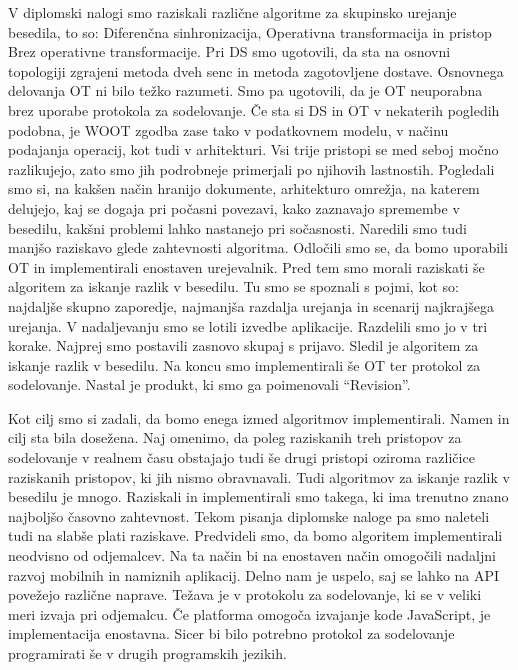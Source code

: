 \documentclass[a4paper, 12pt, twoside]{book}
\begin{document}
V diplomski nalogi smo raziskali različne algoritme za skupinsko urejanje besedila, to so: Diferenčna sinhronizacija, Operativna transformacija in pristop Brez operativne transformacije. Pri DS smo ugotovili, da sta na osnovni topologiji zgrajeni metoda dveh senc in metoda zagotovljene dostave. Osnovnega delovanja OT ni bilo težko razumeti. Smo pa ugotovili, da je OT neuporabna brez uporabe protokola za sodelovanje. Če sta si DS in OT v nekaterih pogledih podobna, je WOOT zgodba zase tako v podatkovnem modelu, v načinu podajanja operacij, kot tudi v arhitekturi. Vsi trije pristopi se med seboj močno razlikujejo, zato smo jih podrobneje primerjali po njihovih lastnostih. Pogledali smo si, na kakšen način hranijo dokumente, arhitekturo omrežja, na katerem delujejo, kaj se dogaja pri počasni povezavi, kako zaznavajo spremembe v besedilu, kakšni problemi lahko nastanejo pri sočasnosti. Naredili smo tudi manjšo raziskavo glede zahtevnosti algoritma. Odločili smo se, da bomo uporabili OT in implementirali enostaven urejevalnik. Pred tem smo morali raziskati še algoritem za iskanje razlik v besedilu. Tu smo se spoznali s pojmi, kot so: najdaljše skupno zaporedje, najmanjša razdalja urejanja in scenarij najkrajšega urejanja. V nadaljevanju smo se lotili izvedbe aplikacije. Razdelili smo jo v tri korake. Najprej smo postavili zasnovo skupaj s prijavo. Sledil je algoritem za iskanje razlik v besedilu. Na koncu smo implementirali še OT ter protokol za sodelovanje. Nastal je produkt, ki smo ga poimenovali “Revision”.

Kot cilj smo si zadali, da bomo enega izmed algoritmov implementirali. Namen in cilj sta bila dosežena. Naj omenimo, da poleg raziskanih treh pristopov za sodelovanje v realnem času obstajajo tudi še drugi pristopi oziroma različice raziskanih pristopov, ki jih nismo obravnavali. Tudi algoritmov za iskanje razlik v besedilu je mnogo. Raziskali in implementirali smo takega, ki ima trenutno znano najboljšo časovno zahtevnost. Tekom pisanja diplomske naloge pa smo naleteli tudi na slabše plati raziskave. Predvideli smo, da bomo algoritem implementirali neodvisno od odjemalcev. Na ta način bi na enostaven način omogočili nadaljni razvoj mobilnih in namiznih aplikacij. Delno nam je uspelo, saj se lahko na API povežejo različne naprave. Težava je v protokolu za sodelovanje, ki se v veliki meri izvaja pri odjemalcu. Če platforma omogoča izvajanje kode JavaScript, je implementacija enostavna. Sicer bi bilo potrebno protokol za sodelovanje programirati še v drugih programskih jezikih.
\end{document}

